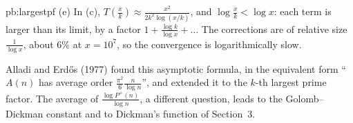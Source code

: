 \begin{solution}{pb:largestpf}
(e) In (c), $T(\frac xk)\approx\frac{x^2}{2k^2\log(x/k)}$, and $\log\frac xk<\log x$: each term is larger than its limit, by a factor $1+\frac{\log k}{\log x}+\dots$ The
corrections are of relative size $\frac1{\log x}$, about $6\%$ at $x=10^7$, so the convergence is logarithmically slow.

\leads Alladi and Erd\H os (1977) found this asymptotic formula, in the equivalent form ``$A(n)$ has average order $\frac{\pi^2}6\frac n{\log n}$'', and extended it to the $k$-th largest prime
factor. The average of $\frac{\log P^+(n)}{\log n}$, a different question, leads to the Golomb--Dickman constant and to Dickman's function of Section~3.
\end{solution}

